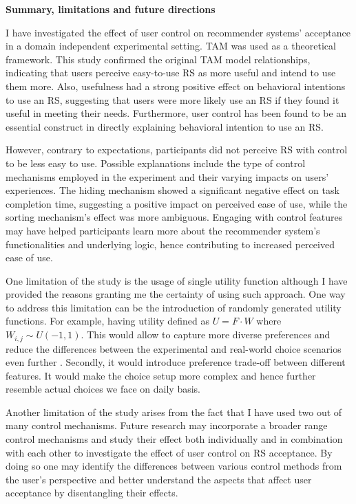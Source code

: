 \documentclass[a4paper,12pt]{article}
\begin{document}
\textbf{Summary, limitations and future directions}

I have investigated the effect of user control on recommender systems' acceptance in a domain independent experimental setting. TAM was used as a theoretical framework. This study confirmed the original TAM model relationships, indicating that users perceive easy-to-use RS as more useful and intend to use them more. Also, usefulness had a strong positive effect on behavioral intentions to use an RS, suggesting that users were more likely use an RS if they found it useful in meeting their needs. Furthermore, user control has been found to be an essential construct in directly explaining behavioral intention to use an RS.

However, contrary to expectations, participants did not perceive RS with control to be less easy to use. Possible explanations include the type of control mechanisms employed in the experiment and their varying impacts on users' experiences. The hiding mechanism showed a significant negative effect on task completion time, suggesting a positive impact on perceived ease of use, while the sorting mechanism's effect was more ambiguous. Engaging with control features may have helped participants learn more about the recommender system's functionalities and underlying logic, hence contributing to increased perceived ease of use.

One limitation of the study is the usage of single utility function although I have provided the reasons granting me the certainty of using such approach. One way to address this limitation can be the introduction of randomly generated utility functions. For example, having utility defined as $U = F \cdot W$ where $W_{i,j} \sim U(-1,1)$. This would allow to capture more diverse preferences and reduce the differences between the experimental and real-world choice scenarios even further \citep{vesanen2007personalization}. Secondly, it would introduce preference trade-off between different features. It would make the choice setup more complex and hence further resemble actual choices we face on daily basis.

Another limitation of the study arises from the fact that I have used two out of many control mechanisms. Future research may incorporate a broader range control mechanisms and study their effect both individually and in combination with each other to investigate the effect of user control on RS acceptance. By doing so one may identify the differences between various control methods from the user's perspective and better understand the aspects that affect user acceptance by disentangling their effects. 
\end{document}

